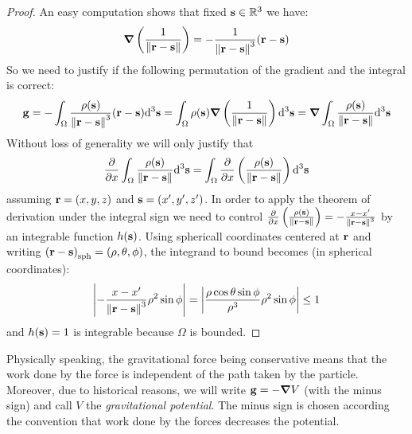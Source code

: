 \documentclass[../main.tex]{subfiles}
\begin{document}
\begin{proof}
  An easy computation shows that fixed $\boldsymbol{\mathrm{s}}\in\mathbb{R}^3$ we have:
  \begin{equation}
    \grad\left(\frac{1}{\left\|\boldsymbol{\mathrm{r}}-\boldsymbol{\mathrm{s}}\right\|}\right)=-\frac{1}{\left\|\boldsymbol{\mathrm{r}}-\boldsymbol{\mathrm{s}}\right\|^3}(\boldsymbol{\mathrm{r}}-\boldsymbol{\mathrm{s}})
  \end{equation}
  So we need to justify if the following permutation of the gradient and the integral is correct:
  \begin{equation}
    \boldsymbol{\mathrm{g}}=-\int_{\Omega}\frac{\rho(\boldsymbol{\mathrm{s}})}{\left\|\boldsymbol{\mathrm{r}}-\boldsymbol{\mathrm{s}}\right\|^3}(\boldsymbol{\mathrm{r}}-\boldsymbol{\mathrm{s}})\dd^3{\boldsymbol{\mathrm{s}}}=\int_{\Omega}\rho(\boldsymbol{\mathrm{s}})\grad\left(\frac{1}{\left\|\boldsymbol{\mathrm{r}}-\boldsymbol{\mathrm{s}}\right\|}\right)\dd^3{\boldsymbol{\mathrm{s}}}=\grad\int_{\Omega}\frac{\rho(\boldsymbol{\mathrm{s}})}{\left\|\boldsymbol{\mathrm{r}}-\boldsymbol{\mathrm{s}}\right\|}\dd^3{\boldsymbol{\mathrm{s}}}
  \end{equation}
  Without loss of generality we will only justify that
  \begin{equation}
    \pdv{}{x}\int_{\Omega}\frac{\rho(\boldsymbol{\mathrm{s}})}{\left\|\boldsymbol{\mathrm{r}}-\boldsymbol{\mathrm{s}}\right\|}\dd^3{\boldsymbol{\mathrm{s}}}=\int_{\Omega}\pdv{}{x}\left(\frac{\rho(\boldsymbol{\mathrm{s}})}{\left\|\boldsymbol{\mathrm{r}}-\boldsymbol{\mathrm{s}}\right\|}\right)\dd^3{\boldsymbol{\mathrm{s}}}
  \end{equation}
  assuming $\boldsymbol{\mathrm{r}}=(x,y,z)$ and $\boldsymbol{\mathrm{s}}=(x',y',z')$. In order to apply the theorem of derivation under the integral sign we need to control $\pdv{}{x}\left(\frac{\rho(\boldsymbol{\mathrm{s}})}{\left\|\boldsymbol{\mathrm{r}}-\boldsymbol{\mathrm{s}}\right\|}\right)=-\frac{x-x'}{\left\|\boldsymbol{\mathrm{r}}-\boldsymbol{\mathrm{s}}\right\|^3}$ by an integrable function $h(\boldsymbol{\mathrm{s}})$. Using sphericall coordinates centered at $\boldsymbol{\mathrm{r}}$ and writing ${(\boldsymbol{\mathrm{r}}-\boldsymbol{\mathrm{s}})}_{\mathrm{sph}}=(\rho,\theta,\phi)$, the integrand to bound becomes (in spherical coordinates):
  \begin{equation}
    \abs{-\frac{x-x'}{\left\|\boldsymbol{\mathrm{r}}-\boldsymbol{\mathrm{s}}\right\|^3}\rho^2\sin\phi}=\abs{\frac{\rho\cos\theta\sin\phi}{\rho^3}\rho^2\sin\phi}\leq 1
  \end{equation}
  and $h(\boldsymbol{\mathrm{s}})=1$ is integrable because $\Omega$ is bounded.
\end{proof}
Physically speaking, the gravitational force being conservative means that the work done by the force is independent of the path taken by the particle. Moreover, due to historical reasons, we will write $\boldsymbol{\mathrm{g}}=-\grad V$ (with the minus sign) and call $V$ the \emph{gravitational potential}. The minus sign is chosen according the convention that work done by the forces decreases the potential.
\end{document}

